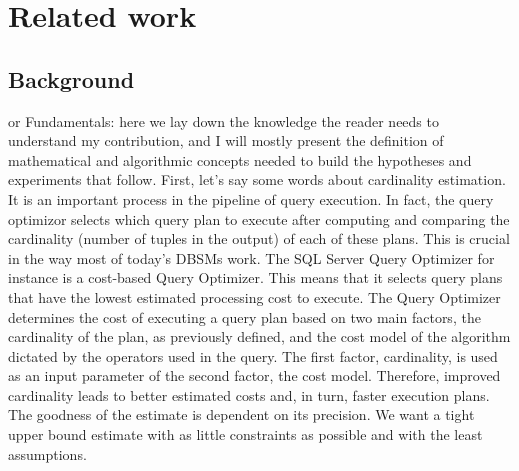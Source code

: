 
\chapter{Related work}\label{chapter:relatedwork}

\section{Background}
or Fundamentals:  here we lay down the knowledge the reader needs to understand
my contribution, and I will mostly present the definition of mathematical and 
algorithmic concepts needed to build the hypotheses and experiments that follow.
First, let's say some words about cardinality estimation. It is an important process
in the pipeline of query execution. In fact, the query optimizor selects which 
query plan to execute after computing and comparing the  cardinality (number of tuples in 
the output) of each of these plans. 
This is crucial in the way most of today's DBSMs work. 
The SQL Server Query Optimizer \parencite{microsoft2023cardinality} for instance 
is a cost-based Query Optimizer. This means that it selects query plans that have the lowest 
estimated processing cost to execute.
 The Query Optimizer determines the cost of executing a query plan based on 
 two main factors, the cardinality of the plan, as previously defined, and the cost model
 of the algorithm dictated by the operators used in the query.
The first factor, cardinality, is used as an input parameter of the 
second factor, the cost model. Therefore, improved cardinality leads to 
better estimated costs and, in turn, faster execution plans. The goodness of the estimate
is dependent on its precision. We want a tight upper bound estimate
with as little constraints as possible and with the least assumptions.

